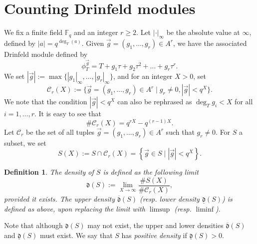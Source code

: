 \documentclass[11pt]{amsart}
\newtheorem{definition}[theorem]{Definition}
\newcommand{\F}{\mathbb{F}}
\newcommand{\cC}{\mathcal{C}}
\newcommand{\op}[1]{\operatorname{#1}}
\numberwithin{equation}{section}
\begin{document}
\section{Counting Drinfeld modules}\label{s 4}

\par We fix a finite field $\F_q$ and an integer $r\geq 2$. Let $|\cdot|_\infty$ be the absolute value at $\infty$, defined by $|a|=q^{\op{deg}_T(a)}$. Given $\vec{g}=(g_1, \dots, g_r) \in A^r$, we have the associated Drinfeld module defined by
\[\phi_T^{\vec{g}}=T+g_1\tau+g_2\tau^2+\dots+ g_r \tau^r. \]
We set $|\vec{g}|:=\op{max}\{|g_1|_{\infty} , \dots, |g_r|_{\infty}\}$, and for an integer $X>0$, set \[\cC_r(X):=\{\vec{g}=(g_1, \dots, g_r)\in A^r\mid g_r\neq 0, |\vec{g}|< q^X\}.\]
We note that the condition $|\vec{g}|<q^X$ can also be rephrased as $\op{deg}_T g_i< X$ for all $i=1, \dots, r$. It is easy to see that 
\begin{equation}\label{cC(X) count}\# \cC_r(X)=q^{rX}-q^{(r-1)X}.\end{equation}
Let $\cC_r$ be the set of all tuples $\vec{g}=(g_1, \dots, g_r)\in A^r$ such that $g_r\neq 0$. For $S$ a subset, we set \[S(X):=S\cap \cC_r(X)=\left\{\vec{g}\in S\mid |\vec{g}|< q^X\right\}.\] 
\begin{definition}
    The density of $S$ is defined as the following limit
    \[\mathfrak{d}(S):=\lim_{X\rightarrow \infty} \frac{\# S(X)}{\# \cC_r(X)},\]
    provided it exists. The \emph{upper} density $\overline{\mathfrak{d}}(S)$ (resp. \emph{lower} density $\underline{\mathfrak{d}}(S)$) is defined as above, upon replacing the limit with $\limsup$ (resp. $\liminf$). 
\end{definition}
Note that although $\mathfrak{d}(S)$ may not exist, the upper and lower densities $\overline{\mathfrak{d}}(S)$ and $\underline{\mathfrak{d}}(S)$ must exist. We say that $S$ has \emph{positive density} if $\underline{\mathfrak{d}}(S)>0$.
\end{document}

